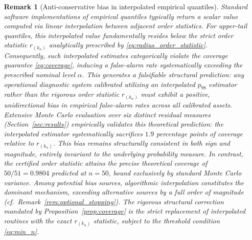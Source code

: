 \documentclass[a4paper]{cas-sc}
\newtheorem{remark}{Remark}
\newcommand{\residual}{\ensuremath{r}}
\begin{document}
\begin{remark}[Anti-conservative bias in interpolated empirical quantiles]
\label{rem:interpolation_bias}
Standard software implementations of empirical quantiles typically return a scalar value computed via linear interpolation between adjacent order statistics. For upper-tail quantiles, this interpolated value fundamentally resides \emph{below} the strict order statistic \(\residual_{(k_\alpha)}\) analytically prescribed by \eqref{eq:radius_order_statistic}. Consequently, such interpolated estimates categorically violate the coverage guarantee \eqref{eq:coverage}, inducing a false-alarm rate systematically exceeding the prescribed nominal level \(\alpha\). This generates a falsifiable structural prediction: any operational diagnostic system calibrated utilizing an interpolated \(p_{98}\) estimator rather than the rigorous order statistic \(\residual_{(k_\alpha)}\) must exhibit a positive, unidirectional bias in empirical false-alarm rates across all calibrated assets. Extensive Monte Carlo evaluation over six distinct residual measures (Section~\ref{sec:results}) empirically validates this theoretical prediction: the interpolated estimator systematically sacrifices \(1.9\) percentage points of coverage relative to \(\residual_{(k_\alpha)}\). This bias remains structurally consistent in both sign and magnitude, entirely invariant to the underlying probability measure. In contrast, the certified order statistic attains the precise theoretical coverage of \(50/51=0.9804\) predicted at \(n=50\), bound exclusively by standard Monte Carlo variance. Among potential bias sources, algorithmic interpolation constitutes the dominant mechanism, exceeding alternative sources by a full order of magnitude (cf.\ Remark~\ref{rem:optional_stopping}). The rigorous structural correction mandated by Proposition~\ref{prop:coverage} is the strict replacement of interpolated routines with the exact \(\residual_{(k_\alpha)}\) statistic, subject to the threshold condition \eqref{eq:min_n}.
\end{remark}
\end{document}
